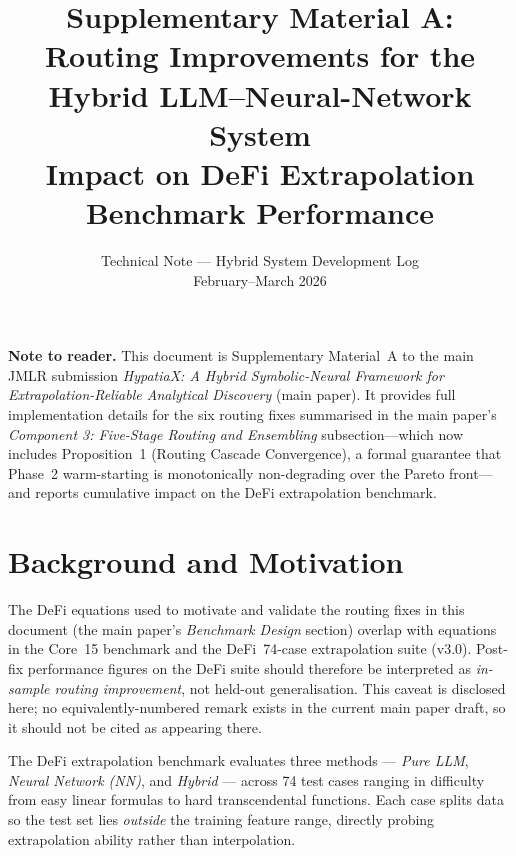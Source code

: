 \documentclass[twoside,11pt]{article}
\begin{document}
\title{%
  Supplementary Material A:\\
  Routing Improvements for the Hybrid LLM--Neural-Network System\\
  \large Impact on DeFi Extrapolation Benchmark Performance
}
\author{\name Technical Note --- Hybrid System Development Log \email{} \\
       \addr February--March 2026}
\maketitle

\tableofcontents
\bigskip

\noindent\textbf{Note to reader.}  This document is Supplementary Material~A to
the main JMLR submission \emph{HypatiaX: A Hybrid Symbolic-Neural Framework for
Extrapolation-Reliable Analytical Discovery} (main paper).
It provides full implementation details for the six routing fixes summarised in the main paper's \emph{Component 3: Five-Stage Routing and Ensembling} subsection---which now includes Proposition~1 (Routing Cascade Convergence), a formal guarantee that Phase~2 warm-starting is monotonically non-degrading over the Pareto front---and reports cumulative impact on the DeFi
extrapolation benchmark.

\section{Background and Motivation}
\label{sec:background}

\begin{remark}
The DeFi equations used to motivate and validate the routing fixes in this
document (the main paper's \emph{Benchmark Design} section) overlap with equations in the Core~15
benchmark and the DeFi~74-case extrapolation suite (v3.0).  Post-fix performance
figures on the DeFi suite should therefore be interpreted as
\emph{in-sample routing improvement}, not held-out generalisation.
This caveat is disclosed here; no equivalently-numbered remark exists in
the current main paper draft, so it should not be cited as appearing there.
\end{remark}

The DeFi extrapolation benchmark evaluates three methods --- \emph{Pure LLM},
\emph{Neural Network (NN)}, and \emph{Hybrid} --- across 74 test cases ranging
in difficulty from easy linear formulas to hard transcendental functions.
Each case splits data so the test set lies \emph{outside} the training feature
range, directly probing extrapolation ability rather than interpolation.
\end{document}
